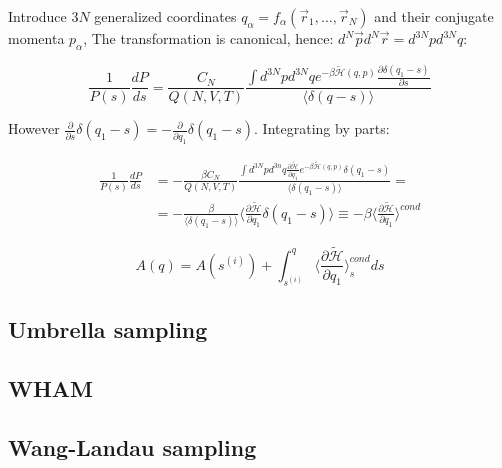 	Introduce $3N$ generalized coordinates $q_\alpha = f_\alpha(\vec{r}_1, \dots, \vec{r}_N)$ and their conjugate momenta $p_\alpha$,
	The transformation is canonical, hence: $d^N\vec{p}d^N\vec{r} = d^{3N}pd^{3N}q$:

	$$\frac{1}{P(s)}\frac{dP}{ds} = \frac{C_N}{Q(N, V, T)}\frac{\int d^{3N}pd^{3N}qe^{-\beta\tilde{\mathcal{H}}(q, p)}\frac{\partial\delta(q_1-s)}{\partial s}}{\langle\delta(q-s)\rangle}$$

	However $\frac{\partial}{\partial s}\delta(q_1-s) = -\frac{\partial}{\partial q_1}\delta(q_1-s)$.
	Integrating by parts:

	\begin{align*}
		\frac{1}{P(s)}\frac{dP}{ds} &=-\frac{\beta C_N}{Q(N, V, T)}\frac{\int d^{3N}pd^{3n}q\frac{\partial\tilde{\mathcal{H}}}{\partial q_1}e^{-\beta\tilde{\mathcal{H}}(q, p)}\delta(q_1-s)}{\langle\delta(q_1-s)\rangle} = \\
																&= -\frac{\beta}{\langle\delta(q_1-s)\rangle}\biggl\langle\frac{\partial\tilde{\mathcal{H}}}{\partial q_1}\delta(q_1-s)\biggr\rangle \equiv -\beta\biggl\langle\frac{\partial\tilde{\mathcal{H}}}{\partial q_1}\biggr\rangle^{cond}
	\end{align*}

	$$A(q) = A(s^{(i)}) + \int_{s^{(i)}}^q\biggl\langle\frac{\partial\tilde{\mathcal{H}}}{\partial q_1}\biggr\rangle^{cond}_sds$$


	\subsection{Umbrella sampling}

	\subsection{WHAM}

	\subsection{Wang-Landau sampling}
